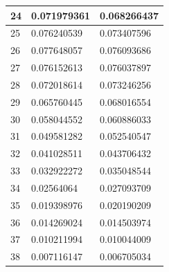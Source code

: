 \documentclass[a4paper]{article}
\begin{document}
\begin{table}[!h]
\begin{center}
\begin{tabular}{|l|l|l|}
24                       & 0.071979361                                           & 0.068266437                                       \\ \hline
25                       & 0.076240539                                           & 0.073407596                                       \\ \hline
26                       & 0.077648057                                           & 0.076093686                                       \\ \hline
27                       & 0.076152613                                           & 0.076037897                                       \\ \hline
28                       & 0.072018614                                           & 0.073246256                                       \\ \hline
29                       & 0.065760445                                           & 0.068016554                                       \\ \hline
30                       & 0.058044552                                           & 0.060886033                                       \\ \hline
31                       & 0.049581282                                           & 0.052540547                                       \\ \hline
32                       & 0.041028511                                           & 0.043706432                                       \\ \hline
33                       & 0.032922272                                           & 0.035048544                                       \\ \hline
34                       & 0.02564064                                            & 0.027093709                                       \\ \hline
35                       & 0.019398976                                           & 0.020190209                                       \\ \hline
36                       & 0.014269024                                           & 0.014503974                                       \\ \hline
37                       & 0.010211994                                           & 0.010044009                                       \\ \hline
38                       & 0.007116147                                           & 0.006705034                                       \\ \hline

\end{tabular}
\end{center}
\end{table}
\end{document}
